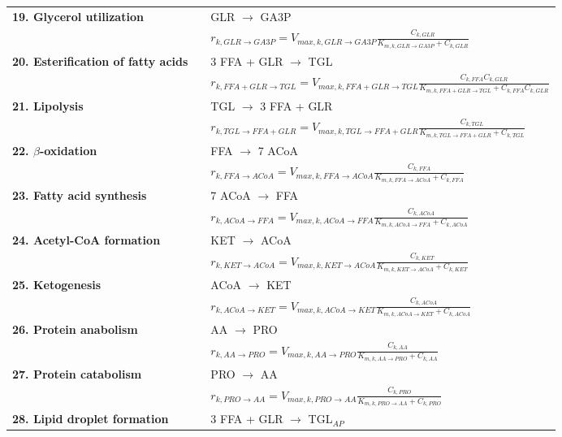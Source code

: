 \documentclass{IEEEtran}
\begin{document}
\begin{supertabular}{ll@{\hspace{-3mm}}l@{\hspace{0mm}}}
\textbf{19. Glycerol utilization} &  & GLR $\rightarrow$ GA3P \\
& &  \large{$r_{k,GLR\rightarrow GA3P} = V_{max,k,GLR\rightarrow GA3P}\frac{ C_{k,GLR}}{K_{m,k,GLR\rightarrow GA3P} + C_{k,GLR}}$} \\
\textbf{20. Esterification of fatty acids}  & & 3 FFA + GLR $\rightarrow$ TGL \\
& &  \large{$r_{k,FFA+GLR\rightarrow TGL} = V_{max,k,FFA+GLR\rightarrow TGL}\frac{ C_{k,FFA}C_{k,GLR}}{K_{m,k,FFA+GLR\rightarrow TGL} + C_{k,FFA}C_{k,GLR}}$} \\
\textbf{21. Lipolysis} & &  TGL $\rightarrow$ 3 FFA + GLR \\
& &  \large{$r_{k,TGL\rightarrow FFA+GLR} = V_{max,k,TGL\rightarrow FFA+GLR}\frac{ C_{k,TGL}}{K_{m,k,TGL\rightarrow FFA+GLR} + C_{k,TGL}}$} \\
\textbf{22. $\beta$-oxidation}  & & FFA $\rightarrow$ 7 ACoA \\
& &  \large{$r_{k,FFA\rightarrow ACoA} = V_{max,k,FFA\rightarrow ACoA}\frac{ C_{k,FFA}}{K_{m,k,FFA\rightarrow ACoA} + C_{k,FFA}}$} \\
\textbf{23. Fatty acid synthesis} & & 7 ACoA $\rightarrow$ FFA \\
& &  \large{$r_{k,ACoA\rightarrow FFA} = V_{max,k,ACoA\rightarrow FFA}\frac{ C_{k,ACoA}}{K_{m,k,ACoA\rightarrow FFA} + C_{k,ACoA}}$} \\
\textbf{24. Acetyl-CoA formation}  & & KET $\rightarrow$ ACoA \\
& &  \large{$r_{k,KET\rightarrow ACoA} = V_{max,k,KET\rightarrow ACoA}\frac{ C_{k,KET}}{K_{m,k,KET\rightarrow ACoA} + C_{k,KET}}$} \\
\textbf{25. Ketogenesis} & & ACoA $\rightarrow$ KET \\
& &  \large{$r_{k,ACoA\rightarrow KET} = V_{max,k,ACoA\rightarrow KET}\frac{ C_{k,ACoA}}{K_{m,k,ACoA\rightarrow KET} + C_{k,ACoA}}$} \\
\textbf{26. Protein anabolism}  & & AA $\rightarrow$ PRO \\
& &  \large{$r_{k,AA\rightarrow PRO} = V_{max,k,AA\rightarrow PRO}\frac{ C_{k,AA}}{K_{m,k,AA\rightarrow PRO} + C_{k,AA}}$} \\
\textbf{27. Protein catabolism}  & & PRO $\rightarrow$ AA \\
& &  \large{$r_{k,PRO\rightarrow AA} = V_{max,k,PRO\rightarrow AA}\frac{ C_{k,PRO}}{K_{m,k,PRO\rightarrow AA} + C_{k,PRO}}$} \\
\textbf{28. Lipid droplet formation}  & & 3 FFA + GLR $\rightarrow$ TGL$_{AP}$ \\

\end{supertabular}
\end{document}
